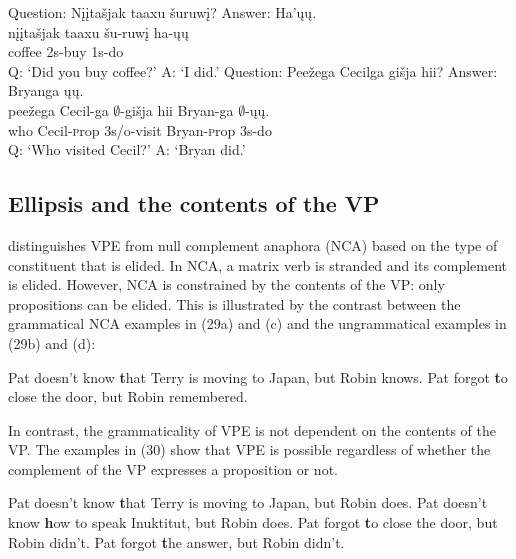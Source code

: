 \documentclass[output=paper]{LSP/langsci}
\begin{document}
\begin{exe}
\ex
\begin{xlist}
\ex
\glll Question: {Nįįtašjak taaxu} šuruwį? Answer: Ha'ųų.\\
{} {nįįtašjak taaxu} šu-ruwį {} ha-ųų\\
{} coffee {\textsc 2s}-buy {} {\textsc 1s}-do\\
 \trans Q: `Did you buy coffee?' A: `I did.'
\ex
\glll Question: Peežega Cecilga {gišja hii}? Answer: Bryanga ųų.\\
{} peežega Cecil-ga $\emptyset$-{gišja hii} {} Bryan-ga $\emptyset$-ųų.\\
{} who Cecil-{\textsc prop} {\textsc 3s/o}-visit {} Bryan-{\textsc prop} {\textsc 3s}-do\\
\trans Q: `Who visited Cecil?' A: `Bryan did.'
\end{xlist}
\end{exe}


\subsection{Ellipsis and the contents of the VP}

\citet{Goldberg2005} distinguishes VPE from null complement anaphora (NCA) based on the type of constituent that is elided. In NCA, a matrix verb is stranded and its complement is elided. However, NCA is constrained by the contents of the VP: only propositions can be elided. This is illustrated by the contrast between the grammatical NCA examples in (29a) and (c) and the ungrammatical examples in (29b) and (d):

\begin{exe}
\ex
\begin{xlist}
\ex
Pat doesn't know {\textbf that Terry is moving to Japan}, but Robin knows.
\ex
Pat forgot {\textbf to close the door}, but Robin remembered.
\end{xlist}
\end{exe}

In contrast, the grammaticality of VPE is not dependent on the contents of the VP. The examples in (30) show that VPE is possible regardless of whether the complement of the VP expresses a proposition or not.

\begin{exe}
\ex
\begin{xlist}
\ex
Pat doesn't know {\textbf that Terry is moving to Japan}, but Robin does.
\ex
Pat doesn't know {\textbf how to speak Inuktitut}, but Robin does.
\ex
Pat forgot {\textbf to close the door}, but Robin didn't.
\ex
Pat forgot {\textbf the answer}, but Robin didn't.
\end{xlist}
\end{exe}
\end{document}
